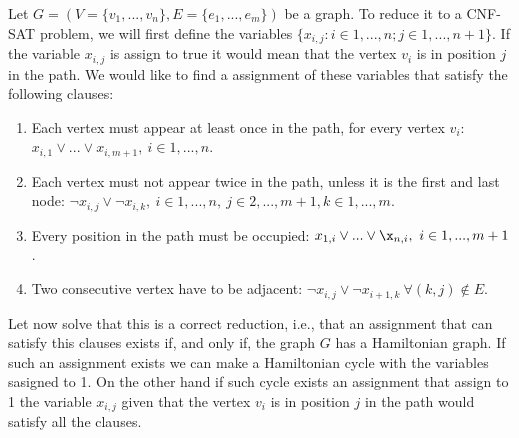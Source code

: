Let $G=(V=\{ v_1,...,v_n\},E= \{e_1,...,e_m\})$ be a graph. To reduce it to a CNF-SAT problem, we will first define the variables $\{x_{i,j}: i\in 1,...,n ; j\in 1,...,n+1 \}$. If the variable $x_{i,j}$ is assign to true it would mean that the vertex $v_i$ is in position $j$ in the path. We would like to find a assignment of these variables that satisfy the following clauses:

\begin{enumerate}
\item Each vertex must appear at least once in the path, for every vertex $v_i$:
  $ x_{i,1} \vee ... \vee x_{i,m+1},\ i \in 1,...,n$.
\item Each vertex must not appear twice in the path, unless it is the first and last node: $\neg x_{i,j} \vee \neg x_{i,k},\ i \in 1,...,n ,\ j \in 2,...,m+1, k \in 1,...,m$.
\item Every position in the path must be occupied:   $ x_{1,i} \vee ... \vee \x_{n,i},\ i \in 1,...,m+1$.
\item Two consecutive vertex have to be adjacent: $\neg x_{i,j} \vee \neg x_{i+1,k}\ \forall (k,j) \not \in E$.
\end{enumerate}

Let now solve that this is a correct reduction, i.e., that an assignment that can satisfy this clauses exists if, and only if, the graph $G$ has a Hamiltonian graph. If such an assignment exists we can make a Hamiltonian cycle with the variables sasigned to 1. On the other hand if such cycle exists an assignment that assign to 1 the variable $x_{i,j}$ given that the vertex $v_i$ is in position $j$ in the path would satisfy all the clauses. 
